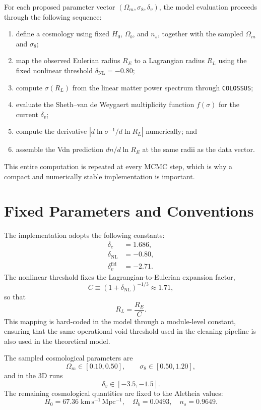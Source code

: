 \documentclass[12pt]{report}
\begin{document}
For each proposed parameter vector $(\Omega_m,\sigma_8,\delta_v)$, the model evaluation proceeds through the following sequence:
\begin{enumerate}
    \item define a cosmology using fixed $H_0$, $\Omega_b$, and $n_s$, together with the sampled $\Omega_m$ and $\sigma_8$;
    \item map the observed Eulerian radius $R_E$ to a Lagrangian radius $R_L$ using the fixed nonlinear threshold $\delta_\mathrm{NL}=-0.80$;
    \item compute $\sigma(R_L)$ from the linear matter power spectrum through \texttt{COLOSSUS};
    \item evaluate the Sheth--van de Weygaert multiplicity function $f(\sigma)$ for the current $\delta_v$;
    \item compute the derivative $|d\ln\sigma^{-1}/d\ln R_L|$ numerically; and
    \item assemble the Vdn prediction $dn/d\ln R_E$ at the same radii as the data vector.
\end{enumerate}

This entire computation is repeated at every MCMC step, which is why a compact and numerically stable implementation is important.

\section{Fixed Parameters and Conventions}

The implementation adopts the following constants:
\begin{align}
    \delta_c &= 1.686,\\
    \delta_\mathrm{NL} &= -0.80,\\
    \delta_v^\mathrm{fid} &= -2.71.
\end{align}
The nonlinear threshold fixes the Lagrangian-to-Eulerian expansion factor,
\begin{equation}
    C \equiv (1+\delta_\mathrm{NL})^{-1/3} \approx 1.71,
\end{equation}
so that
\begin{equation}
    R_L = \frac{R_E}{C}.
\end{equation}
This mapping is hard-coded in the model through a module-level constant, ensuring that the same operational void threshold used in the cleaning pipeline is also used in the theoretical model.

The sampled cosmological parameters are
\begin{equation}
    \Omega_m \in [0.10,0.50], \qquad \sigma_8 \in [0.50,1.20],
\end{equation}
and in the 3D runs
\begin{equation}
    \delta_v \in [-3.5,-1.5].
\end{equation}
The remaining cosmological quantities are fixed to the Aletheia values:
\begin{equation}
    H_0 = 67.36\;\mathrm{km\,s^{-1}\,Mpc^{-1}}, \quad
    \Omega_b = 0.0493, \quad
    n_s = 0.9649.
\end{equation}
\end{document}
